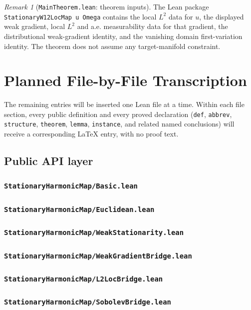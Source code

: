 \documentclass[reqno,11pt]{amsart}
\numberwithin{equation}{section}
\theoremstyle{plain}
\theoremstyle{definition}
\theoremstyle{remark}
\newtheorem{rem}[thm]{Remark}
\begin{document}
\begin{rem}[\texttt{MainTheorem.lean}: theorem inputs]
The Lean package \texttt{StationaryW12LocMap u Omega} contains the local
$L^2$ data for $u$, the displayed weak gradient, local $L^2$ and a.e.
measurability data for that gradient, the distributional weak-gradient
identity, and the vanishing domain first-variation identity.  The theorem does
not assume any target-manifold constraint.
\end{rem}

\section{Planned File-by-File Transcription}

The remaining entries will be inserted one Lean file at a time.  Within each
file section, every public definition and every proved declaration
(\texttt{def}, \texttt{abbrev}, \texttt{structure}, \texttt{theorem},
\texttt{lemma}, \texttt{instance}, and related named conclusions) will receive
a corresponding LaTeX entry, with no proof text.

\subsection{Public API layer}

\subsubsection*{\texttt{StationaryHarmonicMap/Basic.lean}}
\subsubsection*{\texttt{StationaryHarmonicMap/Euclidean.lean}}
\subsubsection*{\texttt{StationaryHarmonicMap/WeakStationarity.lean}}
\subsubsection*{\texttt{StationaryHarmonicMap/WeakGradientBridge.lean}}
\subsubsection*{\texttt{StationaryHarmonicMap/L2LocBridge.lean}}
\subsubsection*{\texttt{StationaryHarmonicMap/SobolevBridge.lean}}
\end{document}
